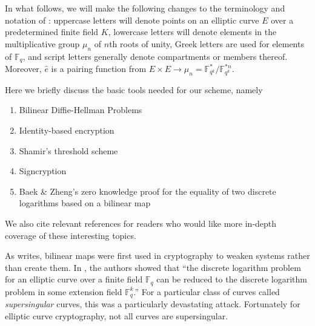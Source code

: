 In what follows, we will make the following changes to the terminology and
    notation of \cite{li2006id}: uppercase letters will denote points on an
    elliptic curve $E$ over a predetermined finite field $K$, lowercase letters
    will denote elements in the multiplicative group $\mu_n$ of $n$th roots of
    unity, Greek letters are used for elements of $\mathbb{F}_q$, and script
    letters generally denote compartments or members thereof.
Moreover, $\widehat{e}$ is a pairing function from $E \times E \to \mu_n =
    \mathbb{F}_{q^k}^\ast/\mathbb{F}_{q^k}^{\ast n}$.

Here we briefly discuss the basic tools needed for our scheme, namely
\begin{enumerate}
\item Bilinear Diffie-Hellman Problems
\item Identity-based encryption
\item Shamir's threshold scheme
\item Signcryption
\item Baek \& Zheng's zero knowledge proof for the equality of two discrete
    logarithms based on a bilinear map
\end{enumerate}
We also cite relevant references for readers who would like more in-depth
    coverage of these interesting topics.

As \cite{menezes1996handbook} writes, bilinear maps were first used in
    cryptography to weaken systems rather than create them.
In \cite{menezes1993reducing}, the authors showed that ``the discrete logarithm
    problem for an elliptic curve over a finite field $\mathbb{F}_q$ can be
    reduced to the discrete logarithm problem in some extension field
    $\mathbb{F}_q^k$.''
For a particular class of curves called \textit{supersingular} curves, this was
    a particularly devastating attack.
Fortunately for elliptic curve cryptography, not all curves are supersingular.


